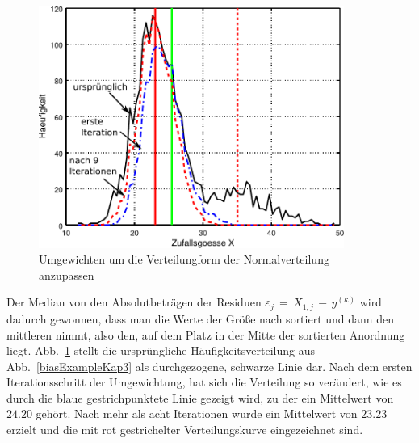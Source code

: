 \begin{figure}
\begin{center}
\includegraphics[width=100mm]{03_vorlesung/media/learn_robust_2.pdf}
\caption{\label{RobustIter} Umgewichten um die Verteilungform der Normalverteilung anzupassen}
\end{center}
\end{figure}

Der Median von den Absolutbeträgen der Residuen $\varepsilon_j \, = \, X_{1,j} \, - \, y^{(\kappa)}$ wird dadurch gewonnen,
dass man die Werte der Größe nach sortiert und dann den mittleren nimmt, also den, auf dem Platz in der Mitte der sortierten
Anordnung liegt.
Abb.~\ref{RobustIter} stellt die ursprüngliche Häufigkeitsverteilung aus Abb.~\ref{biasExampleKap3} als
durchgezogene, schwarze Linie dar. Nach dem ersten Iterationsschritt der Umgewichtung, hat sich die Verteilung so verändert,
wie es durch die blaue gestrichpunktete Linie gezeigt wird, zu der ein Mittelwert von $24.20$ gehört. Nach mehr als acht Iterationen
wurde ein Mittelwert von $23.23$ erzielt und die mit rot gestrichelter Verteilungskurve eingezeichnet sind.
